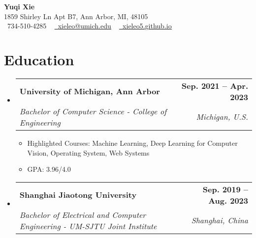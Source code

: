 \documentclass[letterpaper,11pt]{article}
\makeatletter
\newcommand{\resumeSubheading}[5]{
  \vspace{-2pt}\item
    \begin{tabular*}{1.0\textwidth}[t]{l@{\extracolsep{\fill}}r}
      \textbf{#1} \textit{#2} & \textbf{\small #3} \\
      \textit{\small#4} & \textit{\small #5} \\
    \end{tabular*}\vspace{-7pt}
}
\newcommand{\resumeSubHeadingListStart}{\begin{itemize}[leftmargin=0.0in, label={}]}
\newcommand{\resumeSubHeadingListEnd}{\end{itemize}}
\makeatother
\begin{document}

\begin{center}
    {\Large \textbf{Yuqi Xie} } \\ \vspace{1pt}
    1859 Shirley Ln Apt B7, Ann Arbor, MI, 48105 \\ \vspace{1pt}
    \small \raisebox{-0.1\height}\faPhone\ 734-510-4285 ~ \href{mailto:xieleo@umich.edu}{\raisebox{-0.2\height}\faEnvelope\  \underline{xieleo@umich.edu}} ~ 
    \href{https://xieleo5.github.io}{\raisebox{-0.2\height}\faGithub\ \underline{xieleo5.github.io}}
    \vspace{-8pt}
\end{center}


\section{Education}
  \resumeSubHeadingListStart
    \resumeSubheading
      {University of Michigan, Ann Arbor}{}{Sep. 2021 -- Apr. 2023}
      {Bachelor of Computer Science - College of Engineering}{Michigan, U.S.}
    \begin{itemize}
      \item \small Highlighted Courses: Machine Learning, Deep Learning for Computer Vision, Operating System, Web Systems
      \item \small GPA: 3.96/4.0
    \end{itemize}
    \vspace*{6.0\multicolsep}
  \resumeSubHeadingListEnd
  \resumeSubHeadingListStart
    \resumeSubheading
      {Shanghai Jiaotong University}{}{Sep. 2019 -- Aug. 2023}
      {Bachelor of Electrical and Computer Engineering - UM-SJTU Joint Institute}{Shanghai, China}
  \resumeSubHeadingListEnd
\end{document}
